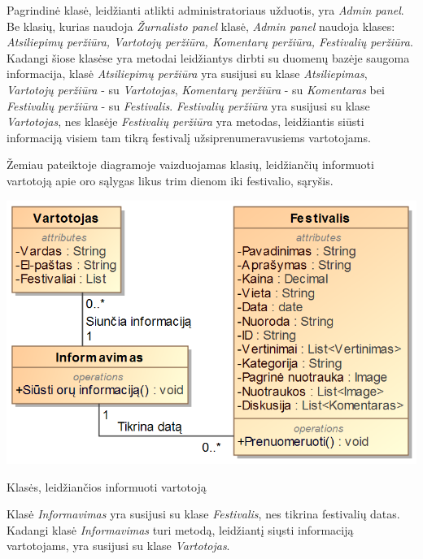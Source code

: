 ﻿\documentclass{VUMIFPSkursinis}
\begin{document}
Pagrindinė klasė, leidžianti atlikti administratoriaus užduotis, yra \textit{Admin panel}. Be klasių, kurias naudoja \textit{Žurnalisto panel} klasė, \textit{Admin panel} naudoja klases: \textit{Atsiliepimų peržiūra, Vartotojų peržiūra, Komentarų peržiūra, Festivalių peržiūra}. Kadangi šiose klasėse yra metodai leidžiantys dirbti su duomenų bazėje saugoma informacija, klasė \textit{Atsiliepimų peržiūra} yra susijusi su klase \textit{Atsiliepimas}, \textit{Vartotojų peržiūra} - su \textit{Vartotojas}, \textit{Komentarų peržiūra} - su \textit{Komentaras} bei \textit{Festivalių peržiūra} - su \textit{Festivalis}. \textit{Festivalių peržiūra} yra susijusi su klase \textit{Vartotojas}, nes klasėje \textit{Festivalių peržiūra} yra metodas, leidžiantis siūsti informaciją visiem tam tikrą festivalį užsiprenumeravusiems vartotojams.

Žemiau pateiktoje diagramoje vaizduojamas klasių, leidžiančių informuoti vartotoją apie oro sąlygas likus trim dienom iki festivalio, sąryšis.
\begin{center}
    \includegraphics[scale=0.5]{img/PSI3/orai.PNG}
	\label{uml:19}
	\caption{Klasės, leidžiančios informuoti vartotoją}
\end{center}
Klasė \textit{Informavimas} yra susijusi su klase \textit{Festivalis}, nes tikrina festivalių datas. Kadangi klasė \textit{Informavimas} turi metodą, leidžiantį siųsti informaciją vartotojams, yra susijusi su klase \textit{Vartotojas}.
\end{document}
